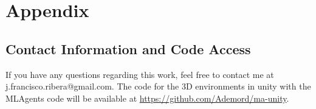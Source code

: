 \chapter{Appendix}\label{sec:chapAppendix}

\section{Contact Information and Code Access}
If you have any questions regarding this work, feel free to contact me at j.francisco.ribera@gmail.com. The code for the 3D environments in unity with the MLAgents code will be available at \url{https://github.com/Ademord/ma-unity}.

\newpage



